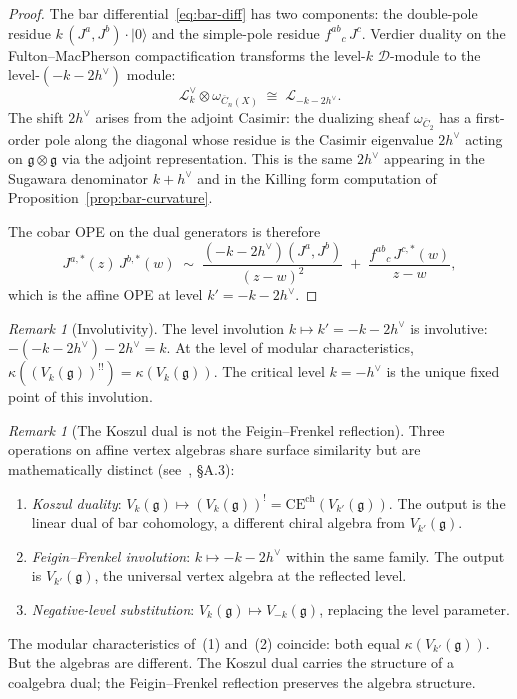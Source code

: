 \documentclass[11pt]{article}
\theoremstyle{plain}
\theoremstyle{definition}
\theoremstyle{remark}
\newtheorem{remark}[theorem]{Remark}
\newcommand{\fg}{\mathfrak{g}}
\newcommand{\CE}{\mathrm{CE}}
\numberwithin{equation}{section}
\begin{document}
\begin{proof}
The bar differential~\eqref{eq:bar-diff} has two components:
the double-pole residue $k\,(J^a, J^b) \cdot |0\rangle$
and the simple-pole residue $f^{ab}{}_c\, J^c$.
Verdier duality on the Fulton--MacPherson compactification
transforms the level-$k$ $\mathcal{D}$-module to the
level-$(-k{-}2h^\vee)$ module:
\begin{equation}\label{eq:verdier-shift}
\mathcal{L}_k^\vee \otimes \omega_{\overline{C}_n(X)}
\;\cong\; \mathcal{L}_{-k-2h^\vee}.
\end{equation}
The shift $2h^\vee$ arises from the adjoint Casimir:
the dualizing sheaf $\omega_{\overline{C}_2}$ has a
first-order pole along the diagonal whose residue is the
Casimir eigenvalue $2h^\vee$ acting on
$\fg \otimes \fg$ via the adjoint representation.
This is the same $2h^\vee$ appearing in the Sugawara
denominator $k + h^\vee$ and in the Killing form
computation of Proposition~\ref{prop:bar-curvature}.

The cobar OPE on the dual generators is therefore
\begin{equation}
J^{a,*}(z)\, J^{b,*}(w) \;\sim\;
\frac{(-k{-}2h^\vee)(J^a, J^b)}{(z{-}w)^2}
\;+\; \frac{f^{ab}{}_c\, J^{c,*}(w)}{z{-}w},
\end{equation}
which is the affine OPE at level $k' = -k - 2h^\vee$.
\end{proof}

\begin{remark}[Involutivity]\label{rem:involutivity}
The level involution $k \mapsto k' = -k - 2h^\vee$ is
involutive: $-(-k{-}2h^\vee) - 2h^\vee = k$.
At the level of modular characteristics,
$\kappa((V_k(\fg))^{!!}) = \kappa(V_k(\fg))$.
The critical level $k = -h^\vee$ is the unique fixed
point of this involution.
\end{remark}

\begin{remark}[The Koszul dual is not the Feigin--Frenkel
 reflection]\label{rem:not-ff}
Three operations on affine vertex algebras share surface
similarity but are mathematically distinct
\textup{(}see~\cite{Lor-MKD}, \S A.3\textup{)}:
\begin{enumerate}[(1)]
\item \emph{Koszul duality}: $V_k(\fg) \mapsto (V_k(\fg))^!
 = \CE^{\mathrm{ch}}(V_{k'}(\fg))$.
 The output is the linear dual of bar cohomology,
 a different chiral algebra from $V_{k'}(\fg)$.
\item \emph{Feigin--Frenkel involution}:
 $k \mapsto -k - 2h^\vee$ within the same family.
 The output is $V_{k'}(\fg)$, the universal vertex
 algebra at the reflected level.
\item \emph{Negative-level substitution}:
 $V_k(\fg) \mapsto V_{-k}(\fg)$, replacing the level
 parameter.
\end{enumerate}
The modular characteristics of~(1) and~(2) coincide:
both equal $\kappa(V_{k'}(\fg))$. But the
algebras are different. The Koszul dual carries the
structure of a coalgebra dual; the Feigin--Frenkel
reflection preserves the algebra structure.
\end{remark}
\end{document}
